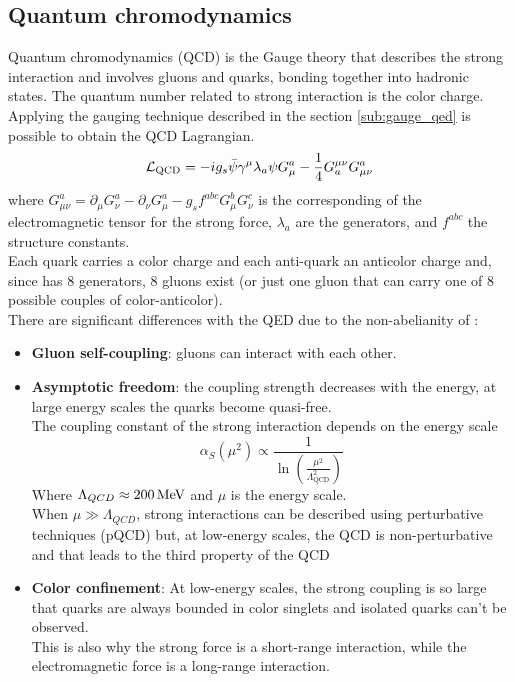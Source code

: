 \subsection{Quantum chromodynamics}\label{sub:QCD}
Quantum chromodynamics (QCD) is the  Gauge theory that describes the strong interaction and involves gluons and quarks, bonding together into hadronic states.
The quantum number related to strong interaction is the color charge.
Applying the gauging technique described in the section \ref{sub:gauge_qed} is possible to obtain the QCD Lagrangian.
\begin{equation}\label{eq:QCD}
    \mathcal{L}_\text{QCD}=-i g_{s}\bar{\psi}\gamma^{\mu}\lambda_{a}\psi G_{\mu}^a-\frac{1}{4}G_{a}^{\mu\nu}G_{\mu\nu}^a
\end{equation}
where \(G_{\mu\nu}^{a}=\partial_{\mu}G_{\nu}^{a}-\partial_{\nu}G_{\mu}^{a}-g_{s}f^{a b c}G_{\mu}^{b}G_{\nu}^{c}\) is the corresponding of the electromagnetic tensor for the strong force, $\lambda_a$ are the  generators, and $f^{abc}$ the  structure constants.\\
Each quark carries a color charge and each anti-quark an anticolor charge and, since  has 8 generators, 8 gluons exist (or just one gluon that can carry one of 8 possible couples of color-anticolor).\\
There are significant differences with the QED due to the non-abelianity of :
\begin{itemize}
    \item \textbf{Gluon self-coupling}: gluons can interact with each other.
    \item \textbf{Asymptotic freedom}: the coupling strength decreases with the energy, \ie at large energy scales the quarks become quasi-free.\\
    The coupling constant of the strong interaction depends on the energy scale \cite{Deur2016TheCoupling}
    \begin{equation}\label{eq:alphas_run}
        \alpha_S(\mu^2)\propto \frac{1}{\ln \left( \frac{\mu^2}{\Lambda_{\text{QCD}}^2}\right)}        
    \end{equation}
    Where $\Lambda_{QCD}\approx 200 {\,\text{Me\hspace{-.08em}V}}$ and $\mu$ is the energy scale.\\
    When $\mu \gg \Lambda_{QCD}$, strong interactions can be described using perturbative techniques (pQCD) but, at low-energy scales, the QCD is non-perturbative and that leads to the third property of the QCD
    \item \textbf{Color confinement}: At low-energy scales, the strong coupling is so large that quarks are always bounded in color singlets and isolated quarks can't be observed.\\
    This is also why the strong force is a short-range interaction, while the electromagnetic force is a long-range interaction.
\end{itemize}

